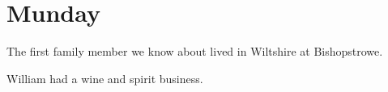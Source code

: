 \section{Munday}

The first family member we know about lived in Wiltshire at Bishopstrowe.

William had a wine and spirit business.
